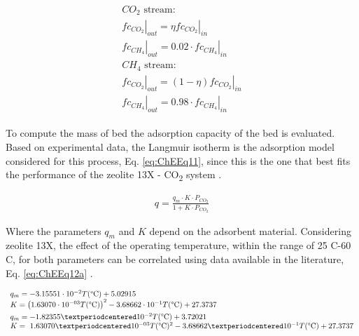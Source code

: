 \begin{refsection}[referencesCh7]
\begin{align}
\begin{array}{l} CO_{2}{\text{ stream:}}\\{\left. {fc_{CO_{2}}} \right|_{out}} = \eta {\left. {fc_{CO_{2}}} \right|_{in}}\\{\left. {fc_{CH_{4}}} \right|_{out}} = 0.02\cdot{\left. {fc_{CH_{4}}} \right|_{in}}\\CH_{4}{\text{ stream:}}\\{\left. {fc_{CO_{2}}} \right|_{out}} = (1 - \eta ){\left. {fc_{CO_{2}}} \right|_{in}}\\{\left. {fc_{CH_{4}}} \right|_{out}} = 0.98\cdot{\left. {fc_{CH_{4}}} \right|_{in}}
\end{array} \label{eq:ChEEq10}
\end{align}

To compute the mass of bed the adsorption capacity of the bed is evaluated. Based on experimental data, the Langmuir isotherm is the adsorption model considered for this process, Eq. \ref{eq:ChEEq11}, since this is the one that best fits the performance of the zeolite 13X - CO\textsubscript{2} system \citep{hauchhum2014carbon}. 

\begin{align}
q = \frac{{{q_m}\cdot K\cdot{P_{CO_{2}}}}}{{1 + K\cdot{P_{CO_{2}}}}} \label{eq:ChEEq11}
\end{align}

Where the parameters $q_{m}$ and $K$ depend on the adsorbent material. Considering zeolite 13X, the effect of the operating temperature, within the range of 25 \textdegree C-60 \textdegree C, for both parameters can be correlated using data available in the literature, Eq. \ref{eq:ChEEq12a} \citep{hauchhum2014carbon}.

\begin{subequations}
	\begin{align} 
	& 
	\begin{array}{l}q_m= -3.15551 \cdot 10^{-2}  T(\text{\textdegree C})  + 5.02915 \\ K= \left( 1.63070 \cdot 10^{-03} T(\text{\textdegree C})\right)^2- 3.68662 \cdot 10^{-1} T(\text{\textdegree C}) + 27.3737\end{array}  \label{eq:ChEEq12a}
	\\
	& \begin{array}{l} q_m=-1.82355·10^{-2}  T(\text{\textdegree C})  + 3.72021 \\ K=\ 1.63070·10^{-03}  T(\text{\textdegree C})^2- 3.68662·10^{-1}  T(\text{\textdegree C}) + 27.3737 \end{array} \label{eq:ChEEq12b}
	\end{align}
\end{subequations}


\end{refsection}
